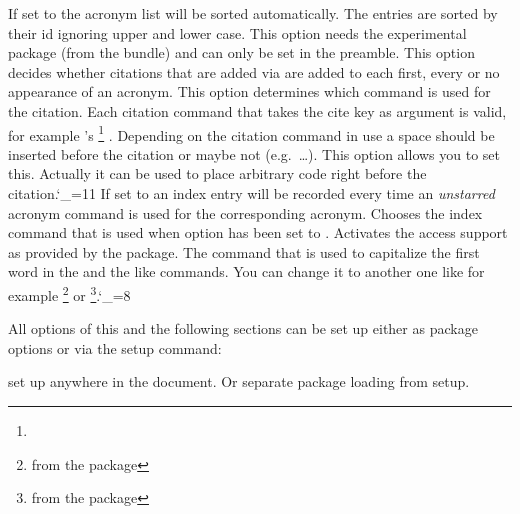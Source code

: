\documentclass[DIV10,toc=index,toc=bib,hyperfootnotes=false]{cnpkgdoc}
\makeatletter
\providecommand*\sinceversion[1]{%
  \@bsphack
  \marginnote{%
    \footnotesize\sffamily\RaggedRight
    \textcolor{black!75}{Introduced in version~#1}}%
  \@esphack}
\makeatother
\begin{document}
\begin{beschreibung}
   If set to  the acronym list will be sorted automatically. The
   entries are sorted by their \acs{id} ignoring upper and lower case. This
   option needs the experimental package  (from the
    bundle) and can only be set in the preamble.
   This option decides whether citations that are added via 
   are added to each first, every or no appearance of an acronym.
   This option determines which command is used for the citation. Each citation
   command that takes the cite key as argument is valid, for example 's%
   \footnote{} .
   Depending on the citation command in use a space should be inserted before the
   citation or maybe not (e.g.\ \ldots). This option allows you to
   set this. Actually it can be used to place arbitrary code right before the
   citation.\catcode`\_=11
   \sinceversion{1.1}If set to  an index entry will be recorded
   every time an \emph{unstarred} acronym command is used for the corresponding
   acronym.
   \sinceversion{1.1}Chooses the index command that is used when option 
   has been set to .
   \sinceversion{1.0}Activates the access support as provided by the 
    package.
   The command that is used to capitalize the first word in the  and the
   like commands. You can change it to another one like for example
   \footnote{from the  package} or
   \footnote{from the  package}.\catcode`\_=8
\end{beschreibung}

All options of this and the following sections can be set up either as package
options or via the setup command:
\begin{beschreibung}
 \newline
   set up \acro anywhere in the document. Or separate package loading from setup.
\end{beschreibung}
\end{document}
